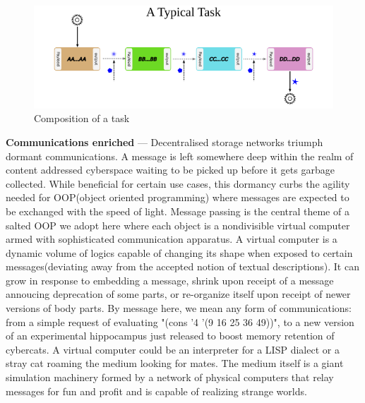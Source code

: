\documentclass[a4paper, 10pt]{article}
\begin{document}
\begin{figure}
\includegraphics[scale=0.7,keepaspectratio=true]{images/task.png}
\caption{\label{task}Composition of a task}
\end{figure}
\par
\textbf{Communications enriched} --- Decentralised storage networks triumph dormant communications. A message is left somewhere deep within the realm of content addressed cyberspace waiting to be picked up before it gets garbage collected. While beneficial for certain use cases, this dormancy curbs the agility needed for OOP(object oriented programming)\cite{kay:1996} where messages are expected to be exchanged with the speed of light. Message passing is the central theme of  a salted OOP we adopt here where each object is a nondivisible virtual computer armed with sophisticated communication apparatus. A virtual computer is a dynamic volume of logics capable of changing its shape when exposed to certain messages(deviating away from the accepted notion of textual descriptions). It can grow in response to embedding a message, shrink upon receipt of a message annoucing deprecation of some parts, or re-organize itself upon receipt of newer versions of body parts. By message here, we mean any form of communications: from a simple request of evaluating "(cons '4 '(9 16 25 36 49))", to a new version of an experimental hippocampus just released to boost memory retention of cybercats. A virtual computer could be an interpreter for a LISP dialect or a stray cat roaming the medium looking for mates. The medium itself is a giant simulation machinery formed by a network of physical computers that relay messages for fun and profit and is capable of realizing strange worlds.
\par
\end{document}
